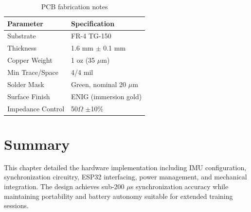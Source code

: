 \begin{table}[h]
    \centering
    \caption{PCB fabrication notes}
    \label{tab:pcb_specs}
    \begin{tabular}{ll}
        \toprule
        \textbf{Parameter} & \textbf{Specification} \\
        \midrule
        Substrate & FR-4 TG-150 \\
        Thickness & 1.6 mm $\pm$ 0.1 mm \\
        Copper Weight & 1 oz (35 $\mu$m) \\
        Min Trace/Space & 4/4 mil \\
        Solder Mask & Green, nominal 20 $\mu$m \\
        Surface Finish & ENIG (immersion gold) \\
        Impedance Control & 50$\Omega$ $\pm$10\% \\
        \bottomrule
    \end{tabular}
\end{table}

\section{Summary}

This chapter detailed the hardware implementation including IMU configuration, synchronization circuitry, ESP32 interfacing, power management, and mechanical integration. The design achieves sub-200 $\mu$s synchronization accuracy while maintaining portability and battery autonomy suitable for extended training sessions.

\newpage